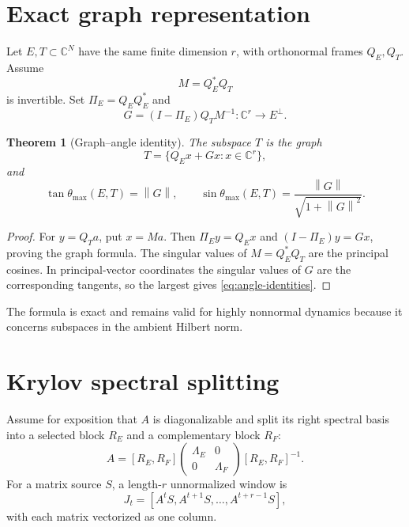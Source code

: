 \documentclass[12pt]{article}
\newtheorem{theorem}{Theorem}[section]
\theoremstyle{remark}
\newcommand{\norm}[1]{\left\lVert#1\right\rVert}
\begin{document}
\section{Exact graph representation}

Let $E,T\subset\mathbb C^N$ have the same finite dimension $r$, with
orthonormal frames $Q_E,Q_T$.  Assume
\begin{equation}\label{eq:transverse}
 M=Q_E^*Q_T
\end{equation}
is invertible.  Set $\Pi_E=Q_EQ_E^*$ and
\begin{equation}\label{eq:graph-map}
 G=(I-\Pi_E)Q_TM^{-1}:\mathbb C^r\to E^\perp.
\end{equation}

\begin{theorem}[Graph--angle identity]\label{thm:graph-angle}
The subspace $T$ is the graph
\begin{equation}\label{eq:graph}
 T=\{Q_Ex+Gx:x\in\mathbb C^r\},
\end{equation}
and
\begin{equation}\label{eq:angle-identities}
 \boxed{
 \tan\theta_{\max}(E,T)=\norm G,
 \qquad
 \sin\theta_{\max}(E,T)=\frac{\norm G}{\sqrt{1+\norm G^2}}.
 }
\end{equation}
\end{theorem}

\begin{proof}
For $y=Q_Ta$, put $x=Ma$.  Then
$\Pi_Ey=Q_Ex$ and $(I-\Pi_E)y=Gx$, proving the graph formula.  The singular
values of $M=Q_E^*Q_T$ are the principal cosines.  In principal-vector
coordinates the singular values of $G$ are the corresponding tangents, so
the largest gives \eqref{eq:angle-identities}.
\end{proof}

The formula is exact and remains valid for highly nonnormal dynamics because
it concerns subspaces in the ambient Hilbert norm.

\section{Krylov spectral splitting}

Assume for exposition that $A$ is diagonalizable and split its right
spectral basis into a selected block $R_E$ and a complementary block $R_F$:
\begin{equation}\label{eq:diagonalization}
 A=[R_E,R_F]
 \begin{pmatrix}\Lambda_E&0\\0&\Lambda_F\end{pmatrix}
 [R_E,R_F]^{-1}.
\end{equation}
For a matrix source $S$, a length-$r$ unnormalized window is
\begin{equation}\label{eq:krylov-window}
 J_t=[A^tS,A^{t+1}S,\ldots,A^{t+r-1}S],
\end{equation}
with each matrix vectorized as one column.
\end{document}
